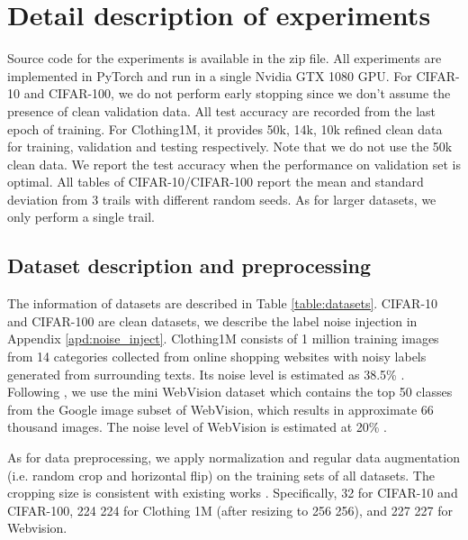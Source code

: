 \documentclass{article}
\begin{document}
\section{Detail description of experiments}
\label{sec:details_of_exp}
Source code for the experiments is available in the zip file. All experiments are implemented in PyTorch and run in a single Nvidia GTX 1080 GPU. For CIFAR-10 and CIFAR-100, we do not perform early stopping since we don't assume the presence of clean validation data. All test accuracy are recorded from the last epoch of training. For Clothing1M, it provides 50k, 14k, 10k refined clean data for training, validation and testing respectively. Note that we do not use the 50k clean data. We report the test accuracy when the performance on validation set is optimal. All tables of CIFAR-10/CIFAR-100 report the mean and standard deviation from 3 trails with different random seeds. As for larger datasets, we only perform a single trail.

\subsection{Dataset description and preprocessing}
\label{sec:preprocess}
The information of datasets are described in Table \ref{table:datasets}. CIFAR-10 and CIFAR-100 are clean datasets, we describe the label noise injection in Appendix \ref{apd:noise_inject}. Clothing1M consists of 1 million training images from 14 categories collected from online shopping websites with noisy labels generated from surrounding texts. Its noise level is estimated as 38.5\% \cite{song2019prestopping}. Following \cite{jiang2017mentornet,chen2019understanding}, we use the mini WebVision dataset which contains the top 50 classes from the Google image subset of WebVision, which results in approximate 66 thousand images. The noise level of WebVision is estimated at 20\% \cite{li2017webvision}.


As for data preprocessing, we apply normalization and regular data augmentation (i.e. random crop and horizontal flip) on the training sets of all datasets. The cropping size is consistent with existing works \cite{liu2020early,li2020dividemix}. Specifically, 32 for CIFAR-10 and CIFAR-100, 224  224 for Clothing 1M (after resizing to 256  256), and 227  227 for Webvision. 
\end{document}
